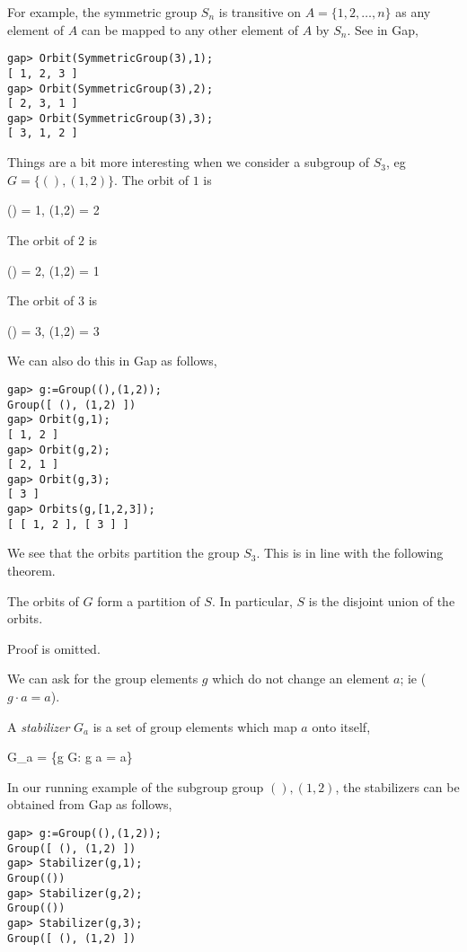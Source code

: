 For example, the symmetric group $S_n$ is transitive on $A = \{1,2,\ldots, n\}$ as any element of $A$ can be mapped to any other element of $A$ by $S_n$. See in Gap,

\begin{verbatim}
gap> Orbit(SymmetricGroup(3),1);
[ 1, 2, 3 ]
gap> Orbit(SymmetricGroup(3),2);
[ 2, 3, 1 ]
gap> Orbit(SymmetricGroup(3),3);
[ 3, 1, 2 ]
\end{verbatim}

Things are a bit more interesting when we consider a subgroup of $S_3$, eg $G = \{(), (1,2)\}$. The orbit of $1$ is 

\bee
()  = 1, \quad (1,2)  = 2
\eee

The orbit of $2$ is

\bee
()  = 2, \quad (1,2)  = 1
\eee

The orbit of $3$ is

\bee
()  = 3, \quad (1,2)  = 3
\eee

We can also do this in Gap as follows,

\begin{verbatim}
gap> g:=Group((),(1,2));
Group([ (), (1,2) ])
gap> Orbit(g,1);
[ 1, 2 ]
gap> Orbit(g,2);
[ 2, 1 ]
gap> Orbit(g,3);
[ 3 ]
gap> Orbits(g,[1,2,3]);
[ [ 1, 2 ], [ 3 ] ]
\end{verbatim}

We see that the orbits partition the group $S_3$. This is in line with the following theorem.

\begin{theorem}
The orbits of $G$ form a partition of $S$. In particular, $S$ is the disjoint union of the orbits.
\end{theorem}

Proof is omitted.

We can ask for the group elements $g$ which do not change an element $a$; ie ($g \cdot a = a$).

\begin{definition}
A \emph{stabilizer} $G_a$ is a set of group elements which map $a$ onto itself,

\bee
G_a = \{g \in G: g \cdot a = a\}
\eee
\end{definition}

In our running example of the subgroup group $(), (1,2)$, the stabilizers can be obtained from Gap as follows,

\begin{verbatim}
gap> g:=Group((),(1,2));
Group([ (), (1,2) ])
gap> Stabilizer(g,1);
Group(())
gap> Stabilizer(g,2);
Group(())
gap> Stabilizer(g,3);
Group([ (), (1,2) ])
\end{verbatim}


